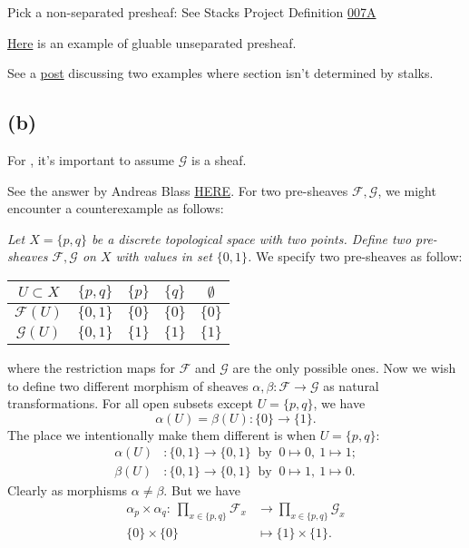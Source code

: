 Pick a non-separated presheaf: See Stacks Project Definition \href{https://stacks.math.columbia.edu/tag/0078}{007A} 

\href{https://www.google.com/url?sa=t&rct=j&q=&esrc=s&source=web&cd=&cad=rja&uact=8&ved=2ahUKEwit-uamm8WEAxUoHTQIHf3_AbwQFnoECA4QAw&url=https%3A%2F%2Fmath.stackexchange.com%2Fquestions%2F1904223%2Fexample-of-a-gluable-unseparated-presheaf%23%3A~%3Atext%3DSuppose%2520Y%2520admits%2520a%2520non%2Cequal%252C%2520but%2520not%2520globally%2520equal.&usg=AOvVaw1IZBw2qkgpiNTBtY1d9HpB&opi=89978449}{Here} is an example of gluable unseparated presheaf.

See a \href{https://math.stackexchange.com/questions/323466/example-of-a-section-s-of-a-presheaf-mathcalf-which-is-not-determined-by}{post} discussing two examples where section isn't determined by stalks.

\subsection{(b)}

For , it's important to assume $\mathscr G$ is a sheaf. 

See the answer by Andreas Blass \href{https://math.stackexchange.com/questions/323466/example-of-a-section-s-of-a-presheaf-mathcalf-which-is-not-determined-by}{HERE}.
For two pre-sheaves $\mathscr F,\mathscr G$, we might encounter a counterexample as follows:

\textit{Let $X=\{p,q\}$ be a discrete topological space with two points. Define two pre-sheaves $\mathscr F,\mathscr G$ on $X$ with values in set $\{0,1\}$.}
We specify two pre-sheaves as follow: 
\begin{center}
	\begin{tabular}{ |c|c|c|c|c| }
		\hline
		$U\subset X$ & $\{p,q\}$ & $\{p\}$ & $\{q\}$ & $\emptyset$\\
		\hline
		$\mathscr F(U)$ & $\{0,1\}$ & $\{0\}$ & $\{0\}$ & $\{0\}$ \\
		\hline
		$\mathscr G(U)$ & $\{0,1\}$ & $\{1\}$ & $\{1\}$ & $\{1\}$\\
		\hline
	\end{tabular}
\end{center} where the restriction maps for $\mathscr F$ and $\mathscr G$ are the only possible ones. Now we wish to define two different morphism of sheaves $\alpha,\beta:\mathscr F\to\mathscr G$ as natural transformations. For all open subsets except $U=\{p,q\}$, we have 
\[\alpha(U)=\beta(U):\{0\}\to\{1\}.\]
The place we intentionally make them different is when $U=\{p,q\}$:
\begin{align*}
	\alpha(U)&:\{0,1\}\to \{0,1\} ~\text{ by }~ 0\mapsto 0,~ 1\mapsto 1;\\
	\beta(U)&:\{0,1\}\to \{0,1\} ~\text{ by }~ 0\mapsto 1,~ 1\mapsto 0.
\end{align*}
Clearly as morphisms $\alpha\neq\beta$. But we have 
\begin{align*}
	\alpha_p\times\alpha_q:~ \prod_{x\in \{p,q\}}\mathscr F_x &\to \prod_{x\in\{p,q\}} \mathscr G_x\\ 
	\{0\}\times\{0\} &\mapsto\{1\}\times\{1\}.
\end{align*}

